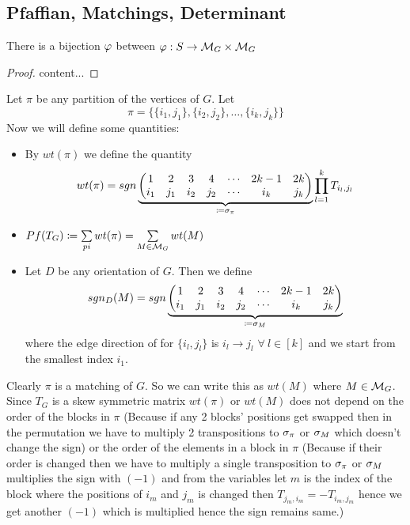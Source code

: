 \subsection{Pfaffian, Matchings, Determinant}
\begin{lemma}\label{lmstomatchpair}
	There is a bijection $\varphi$ between $\varphi: S\to \mathcal{M}_G\times \mathcal{M}_G$
\end{lemma}
\begin{proof}
	content...
\end{proof}
Let $\pi$ be any partition of the vertices of $G$. Let $$\pi=\{\{i_1,j_1\},\{i_2,j_2\},\dots,\{i_k,j_k\}\}$$Now we will define some quantities:\begin{itemize}
	\item By $wt(\pi)$ we define the quantity $$ wt(\pi)=sgn\underbrace{\left(\begin{matrix}1&2&3&4&\cdots & 2k-1&2k\\ i_1& j_1 & i_2 & j_2 & \cdots & i_k & j_k  \end{matrix}\right)}_{\coloneqq \sigma_{\pi}} \prod_{l=1}^k T_{i_l,j_l}$$
	\item $Pf(T_G)\coloneqq \sum\limits_{pi}wt(\pi)=\sum\limits_{M\in \mathcal{M}_G}wt(M)$
	\item Let $D$ be any orientation of $G$. Then we define $$sgn_D(M)=sgn\underbrace{\left(\begin{matrix}1&2&3&4&\cdots & 2k-1&2k\\ i_1& j_1 & i_2 & j_2 & \cdots & i_k & j_k  \end{matrix}\right)}_{\coloneqq \sigma_{M}}$$ where the edge direction of for $\{i_l,j_l\}$ is $i_l\to j_l$ $\forall\ l\in [k]$ and we start from the smallest index $i_1$.
\end{itemize}
Clearly $\pi$  is a matching of $G$. So we can write this as $wt(M)$ where $M\in \mathcal{M}_G$. Since $T_G$ is a skew symmetric matrix $wt(\pi)$ or $wt(M)$ does not depend on the order of the blocks in $\pi$ (Because if any 2 blocks' positions get swapped then in the permutation we have to multiply 2 transpositions to $\sigma_{\pi}$ or $\sigma_M$ which doesn't change the sign) or the order of the elements in a block in $\pi$ (Because if their order is changed then we have to multiply a single transposition to $\sigma_{\pi} $ or $\sigma_M$ multiplies the sign with $(-1)$ and from the variables let $m$ is the index of the block where the positions of $i_m$ and $j_m$ is changed then $T_{j_m,i_m}=-T_{i_m,j_m}$ hence we get another $(-1)$ which is multiplied hence the sign remains same.)

